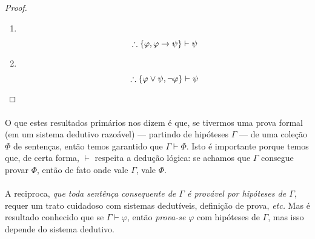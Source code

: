 \begin{proof}
\begin{enumerate}[label=\alph*)]
                \item $ $
                    \begin{prooftree}
                    \end{prooftree}
                    $$\therefore\SET{\varphi}{\varphi\rar\psi}\vdash\psi $$
                
                \item $ $
                    \begin{prooftree}

                        
                    \end{prooftree}
                    $$\therefore\SET{\varphi\lor\psi}{\neg\varphi}\vdash\psi $$
            \end{enumerate}
            \eop
        \end{proof}
        \paragraph{}
            O que estes resultados primários nos dizem é que, se tivermos uma prova formal 
            (em um sistema dedutivo razoável)
            --- partindo de hipóteses $\Gamma$ --- de uma coleção $\Phi$ de sentenças, 
            então temos garantido que $\Gamma\vdash\Phi$. Isto é importante porque temos 
            que, de certa forma, $\vdash$ respeita a dedução lógica: se achamos que 
            $\Gamma$ consegue provar $\Phi$, então de fato onde vale $\Gamma$, vale $\Phi$.
        \paragraph{}
            A reciproca, {\emph{que toda sentênça consequente de $\Gamma$ é provável por 
            hipóteses de $\Gamma$}}, requer um trato cuidadoso com sistemas dedutíveis, 
            definição de prova, {\emph{etc.}} Mas é resultado conhecido que se $\Gamma\vdash\varphi$,
            então {\emph{prova-se}} $\varphi$ com hipóteses de $\Gamma$, mas isso depende do 
            sistema dedutivo.